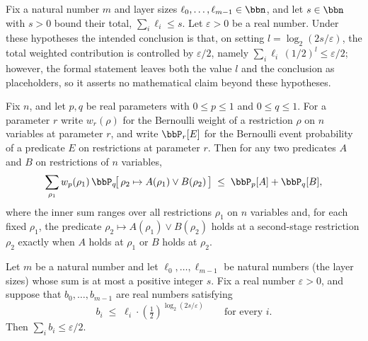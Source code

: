 \begin{theorem}
\label{LMN.iterative_dominant_term_bound}
\leanok
{}
Fix a natural number $m$ and layer sizes $\ell_0,\dots,\ell_{m-1}\in\bbn$, and let
$s\in\bbn$ with $s>0$ bound their total, $\sum_{i} \ell_i \le s$. Let $\varepsilon>0$ be
a real number. Under these hypotheses the intended conclusion is that, on setting
$l=\log_2(2s/\varepsilon)$, the total weighted contribution is controlled by
$\varepsilon/2$, namely $\sum_{i} \ell_i\,(1/2)^{l}\le \varepsilon/2$; however, the
formal statement leaves both the value $l$ and the conclusion as placeholders, so it
asserts no mathematical claim beyond these hypotheses.
\end{theorem}

\begin{theorem}
\label{LMN.two_stage_composed_union_bound}
\leanok
{}
Fix $n$, and let $p,q$ be real parameters with $0\le p\le 1$ and $0\le q\le 1$. For a
parameter $r$ write $w_r(\rho)$ for the Bernoulli weight of a restriction $\rho$ on $n$
variables at parameter $r$, and write $\bbP_r[E]$ for the Bernoulli event probability of
a predicate $E$ on restrictions at parameter $r$. Then for any two predicates $A$ and
$B$ on restrictions of $n$ variables,
\[
\sum_{\rho_1} w_p(\rho_1)\,\bbP_q\!\big[\,\rho_2 \mapsto A(\rho_1)\lor B(\rho_2)\,\big]
\;\le\; \bbP_p[A] + \bbP_q[B],
\]
where the inner sum ranges over all restrictions $\rho_1$ on $n$ variables and, for each
fixed $\rho_1$, the predicate $\rho_2 \mapsto A(\rho_1)\lor B(\rho_2)$ holds at a
second-stage restriction $\rho_2$ exactly when $A$ holds at $\rho_1$ or $B$ holds at
$\rho_2$.
\end{theorem}

\begin{theorem}
\label{LMN.abstract_iterative_reduction}
\leanok
{}
Let $m$ be a natural number and let $\ell_0,\dots,\ell_{m-1}$ be natural numbers (the
layer sizes) whose sum is at most a positive integer $s$. Fix a real number
$\varepsilon>0$, and suppose that $b_0,\dots,b_{m-1}$ are real numbers satisfying
\[
b_i \;\le\; \ell_i\cdot\left(\tfrac12\right)^{\log_2\!\left(2s/\varepsilon\right)}
\qquad\text{for every } i.
\]
Then $\sum_{i} b_i \le \varepsilon/2$.
\end{theorem}
